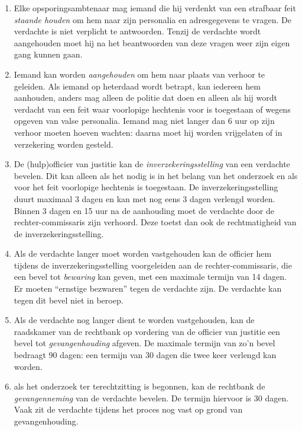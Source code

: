 \documentclass{article}
\begin{document}
\begin{enumerate}

  \item Elke opsporingsambtenaar mag iemand die hij verdenkt van een strafbaar
    feit \emph{staande houden} om hem naar zijn personalia en adresgegevens te
    vragen. De verdachte is niet verplicht te antwoorden. Tenzij de verdachte
    wordt aangehouden moet hij na het beantwoorden van deze vragen weer zijn
    eigen gang kunnen gaan.

  \item Iemand kan worden \emph{aangehouden} om hem naar plaats van verhoor te
    geleiden. Als iemand op heterdaad wordt betrapt, kan iedereen hem
    aanhouden, anders mag alleen de politie dat doen en alleen als hij wordt
    verdacht van een feit waar voorlopige hechtenis voor is toegestaan of
    wegens opgeven van valse personalia. Iemand mag niet langer dan 6 uur op
    zijn verhoor moeten hoeven wachten: daarna moet hij worden vrijgelaten of
    in verzekering worden gesteld.

  \item De (hulp)officier van justitie kan de \emph{inverzekeringsstelling} van
    een verdachte bevelen. Dit kan alleen als het nodig is in het belang van
    het onderzoek en als voor het feit voorlopige hechtenis is toegestaan. De
    inverzekeringsstelling duurt maximaal 3 dagen en kan met nog eens 3 dagen
    verlengd worden. Binnen 3 dagen en 15 uur na de aanhouding moet de
    verdachte door de rechter-commissaris zijn verhoord. Deze toetst dan ook
    de rechtmatigheid van de inverzekeringsstelling.

  \item Als de verdachte langer moet worden vastgehouden kan de officier hem
    tijdens de inverzekeringsstelling voorgeleiden aan de rechter-commissaris,
    die een bevel tot \emph{bewaring} kan geven, met een maximale termijn van
    14 dagen. Er moeten ``ernstige bezwaren'' tegen de verdachte zijn. De
    verdachte kan tegen dit bevel niet in beroep.

  \item Als de verdachte nog langer dient te worden vastgehouden, kan de
    raadskamer van de rechtbank op vordering van de officier van justitie
    een bevel tot \emph{gevangenhouding} afgeven. De maximale termijn van
    zo'n bevel bedraagt 90 dagen: een termijn van 30 dagen die twee keer
    verlengd kan worden.

  \item als het onderzoek ter terechtzitting is begonnen, kan de rechtbank
    de \emph{gevangenneming} van de verdachte bevelen. De termijn hiervoor
    is 30 dagen. Vaak zit de verdachte tijdens het proces nog vast op grond
    van gevangenhouding.

\end{enumerate}
\end{document}
